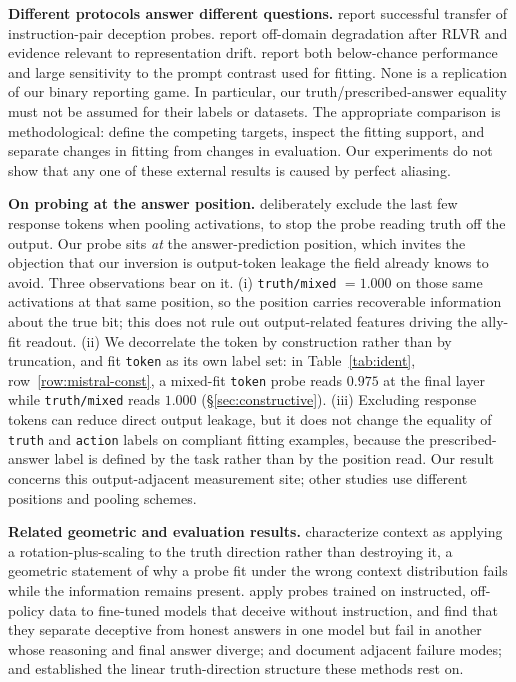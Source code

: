 \documentclass{article}
\newcommand{\tm}{\texttt{truth/mixed}}
\begin{document}
\textbf{Different protocols answer different questions.} \citet{goldowskydill2025} report successful transfer of instruction-pair deception probes. \citet{obfuscationatlas2026} report off-domain degradation after RLVR and evidence relevant to representation drift. \citet{oneprobe2026} report both below-chance performance and large sensitivity to the prompt contrast used for fitting. None is a replication of our binary reporting game. In particular, our truth/prescribed-answer equality must not be assumed for their labels or datasets. The appropriate comparison is methodological: define the competing targets, inspect the fitting support, and separate changes in fitting from changes in evaluation. Our experiments do not show that any one of these external results is caused by perfect aliasing.

\textbf{On probing at the answer position.} \citet{oneprobe2026} deliberately exclude the last few response
tokens when pooling activations, to stop the probe reading truth off the output. Our probe sits \emph{at}
the answer-prediction position, which invites the objection that our inversion is output-token leakage the
field already knows to avoid. Three observations bear on it. (i) \tm{} $= 1.000$ on
those same activations at that same position, so the position carries recoverable information about the true bit; this does not rule out output-related features driving the ally-fit readout. (ii) We
decorrelate the token by construction rather than by truncation, and fit \texttt{token} as its own label set: in Table~\ref{tab:ident}, row~\ref{row:mistral-const}, a mixed-fit \texttt{token} probe reads $0.975$ at the final layer while \tm{} reads $1.000$ (\S\ref{sec:constructive}). (iii) Excluding response tokens can reduce direct output leakage, but it does not change the equality of \texttt{truth} and \texttt{action} labels on compliant fitting examples, because the prescribed-answer label is defined by the task rather than by the position read. Our result concerns this output-adjacent measurement site; other studies use different positions and pooling schemes.

\textbf{Related geometric and evaluation results.} \citet{contextshapestruth2026} characterize context as applying a
rotation-plus-scaling to the truth direction rather than destroying it, a geometric statement of why a probe fit under the wrong context distribution fails while the information remains present.
\citet{strategicdishonesty2025} apply probes trained on instructed, off-policy data to fine-tuned models that deceive without instruction, and find that they separate deceptive from honest answers in one model but fail in another whose reasoning and final answer diverge;
\citet{rift2026} and \citet{liedetectorlimits2026} document adjacent failure modes; and
\citet{geometryoftruth2024} established the linear truth-direction structure these methods rest on.
\end{document}

